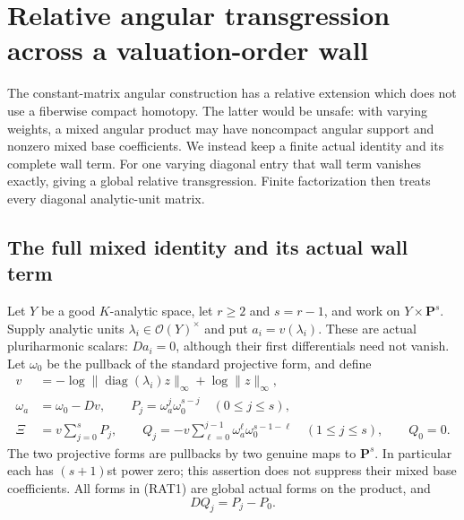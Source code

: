 \section{Relative angular transgression across a valuation-order wall}
\label{sec:r9-relative-rank-one-transgression}

The constant-matrix angular construction has a relative extension
which does not use a fiberwise compact homotopy.  The latter would
be unsafe: with varying weights, a mixed angular product may have
noncompact angular support and nonzero mixed base coefficients.
We instead keep a finite actual identity and its complete wall
term.  For one varying diagonal entry that wall term vanishes
exactly, giving a global relative transgression.  Finite
factorization then treats every diagonal analytic-unit matrix.

\subsection{The full mixed identity and its actual wall term}

Let $Y$ be a good $K$-analytic space, let $r\ge2$ and $s=r-1$,
and work on $Y\times\mathbf P^s$.  Supply analytic units
$\lambda_i\in\mathcal O(Y)^\times$ and put
$a_i=v(\lambda_i)$.  These are actual pluriharmonic scalars:
$Da_i=0$, although their first differentials need not vanish.
Let $\omega_0$ be the pullback of the standard projective form,
and define
\[
 \begin{split}
 v&=-\log\|\operatorname{diag}(\lambda_i)z\|_\infty
                                  +\log\|z\|_\infty,\\
 \omega_a&=\omega_0-Dv,\qquad
 P_j=\omega_a^j\omega_0^{s-j}\quad(0\le j\le s),\\
 \Xi&=v\sum_{j=0}^{s}P_j,\qquad
 Q_j=-v\sum_{\ell=0}^{j-1}\omega_a^\ell\omega_0^{s-1-\ell}
                          \quad(1\le j\le s),\qquad Q_0=0.
 \end{split}
 \tag{RAT1}
\]
The two projective forms are pullbacks by two genuine maps
to $\mathbf P^s$.  In particular each has $(s+1)$st power
zero; this assertion does not suppress their mixed base
coefficients.  All forms in (RAT1) are global actual forms
on the product, and
\[
                            DQ_j=P_j-P_0.
 \tag{RAT2}
\]

